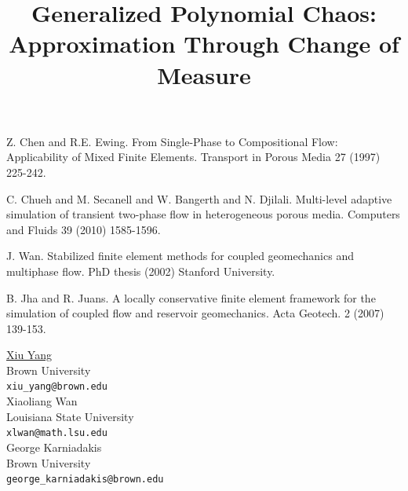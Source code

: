 \documentclass[article, A4, 11pt]{llncs}%
\begin{document}

\begin{thebibliography}{10}
{\sc Z. Chen and R.E. Ewing}. {From Single-Phase to Compositional Flow: Applicability of Mixed Finite Elements}. Transport in Porous Media 27 (1997) 225-242.

{\sc C. Chueh and M. Secanell and W. Bangerth and N. Djilali}. {Multi-level adaptive simulation of transient two-phase flow in heterogeneous porous media}. Computers and Fluids 39 (2010) 1585-1596.

{\sc J. Wan}. {Stabilized finite element methods for coupled geomechanics and multiphase flow}. PhD thesis (2002) Stanford University.

{\sc B. Jha and R. Juans}. {A locally conservative finite element framework for the simulation of coupled flow and reservoir geomechanics}. Acta Geotech. 2 (2007) 139-153.
\end{thebibliography} %

\title{Generalized Polynomial Chaos: Approximation Through Change of Measure}
 \author{} \institute{}
\maketitle
\begin{center}
{\large \underline{Xiu Yang}}\\
Brown University\\
{\tt xiu\_yang@brown.edu}
\\ \vspace{4mm}
{\large Xiaoliang Wan}\\
Louisiana State University\\
{\tt xlwan@math.lsu.edu}
\\ \vspace{4mm}
{\large George  Karniadakis}\\
Brown University\\
{\tt george\_karniadakis@brown.edu}
\end{center}
\end{document}
